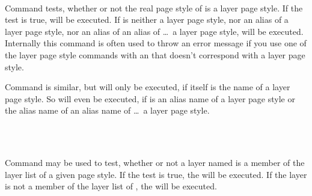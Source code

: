 \begin{Declaration}
  \\
\end{Declaration}
%
%
Command  tests, whether or not the real page
style of  is a layer page style. If the test is true,
 will be executed. If  is neither a
layer page style, nor an alias of a layer page style, nor an alias of an alias
of \dots\ a layer page style,  will be executed. Internally
this command is often used to throw an error message if you use one of the
layer page style commands with an  that doesn't
correspond with a layer page style.

Command  is similar, but 
will only be executed, if  itself is the name of a
layer page style. So  will even be executed, if  is an alias name of a layer page style or the alias name of an
alias name of \dots\ a layer page style.%
%
%

\begin{Declaration}
  \\
  \\
\end{Declaration}
%
%
%
Command  may be used to test, whether or not a layer
named  is a member of the layer list of a given page
style. If the test is true, the  will be executed. If the
layer is not a member of the layer list of , the
 will be executed.

